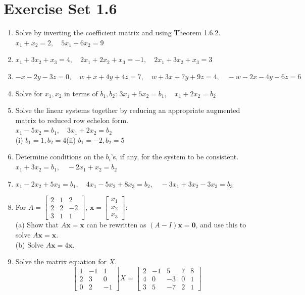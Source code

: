 \documentclass{article}
\theoremstyle{mystyle}
\begin{document}
\section*{Exercise Set 1.6}
\begin{enumerate}
    \item[1.] Solve by inverting the coefficient matrix and using Theorem 1.6.2.\\
    $x_1+x_2=2,\quad 5x_1+6x_2=9$

    \item[3.] $x_1+3x_2+x_3=4,\quad 2x_1+2x_2+x_3=-1,\quad 2x_1+3x_2+x_3=3$

    \item[6.] $-x-2y-3z=0,\quad w+x+4y+4z=7,\quad w+3x+7y+9z=4,\quad -w-2x-4y-6z=6$

    \item[7.] Solve for $x_1,x_2$ in terms of $b_1,b_2$: $3x_1+5x_2=b_1,\quad x_1+2x_2=b_2$

    \item[9.] Solve the linear systems together by reducing an appropriate augmented matrix to reduced row echelon form.\\
    $x_1-5x_2=b_1,\quad 3x_1+2x_2=b_2$\\
    (i) $b_1=1,b_2=4$\qquad (ii) $b_1=-2,b_2=5$

    \item[13.] Determine conditions on the $b_i$'s, if any, for the system to be consistent.\\
    $x_1+3x_2=b_1,\quad -2x_1+x_2=b_2$

    \item[15.] $x_1-2x_2+5x_3=b_1,\quad 4x_1-5x_2+8x_3=b_2,\quad -3x_1+3x_2-3x_3=b_3$

    \item[18.] For $A=\begin{bmatrix}2&1&2\\2&2&-2\\3&1&1\end{bmatrix}$, $\mathbf{x}=\begin{bmatrix}x_1\\x_2\\x_3\end{bmatrix}$:\\
    (a) Show that $A\mathbf{x}=\mathbf{x}$ can be rewritten as $(A-I)\mathbf{x}=\mathbf{0}$, and use this to solve $A\mathbf{x}=\mathbf{x}$.\\
    (b) Solve $A\mathbf{x}=4\mathbf{x}$.

    \item[19.] Solve the matrix equation for $X$.
    \[
    \begin{bmatrix}1&-1&1\\2&3&0\\0&2&-1\end{bmatrix}X=\begin{bmatrix}2&-1&5&7&8\\4&0&-3&0&1\\3&5&-7&2&1\end{bmatrix}
    \]


\end{enumerate}
\end{document}
